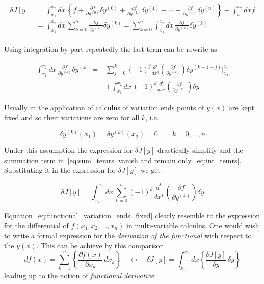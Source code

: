 \begin{align*}
  \delta J[y]
  &=\int_{x_1}^{x_2} dx \, \left\{ f +
    \frac{\partial f}{\partial y^{(0)}} \delta y^{(0)} +
    \frac{\partial f}{\partial y^{(1)}} \delta y^{(1)} + \cdots +
    \frac{\partial f}{\partial y^{(n)}} \delta y^{(n)}
    \right\} - \int_{x_1}^{x_2} dx f \\
  &=\int_{x_1}^{x_2} dx \,
    \sum_{k = 0}^{n} \frac{\partial f}{\partial y^{(k)}} \delta y^{(k)}
   =\sum_{k = 0}^{n}
    \int_{x_1}^{x_2} dx \, \frac{\partial f}{\partial y^{(k)}} \delta y^{(k)} \\
\end{align*}

Using integration by part repeatedly the last term can be rewrite as

\begin{align}
  \label{eq:sum_temrs}
  \int_{x_1}^{x_2} dx \, \frac{\partial f}{\partial y^{(k)}} \delta y^{(k)} =
  & \sum_{j=0}^{k} {(-1)}^j \frac{d^j}{dx^j}
  \left( \frac{\partial f}{\partial y^{(k)}} \right) \delta y^{(k-1-j)}
  \Big|_{x_1}^{x_2} \\
  \label{eq:int_temrs}
  & + \int_{x_1}^{x_2} dx \, {(-1)}^k \frac{d^k}{dx^k}
  \left( \frac{\partial f}{\partial y^{(k)}}\right) \delta y
\end{align}

Usually in the application of calculus of variation ends points of $y(x)$ are
kept fixed and so their variations are zero for all $k$, i.e.

\begin{equation} \label{eq:fixed_ends}
  \delta y^{(k)}(x_1) = \delta y^{(k)}(x_2) = 0  \qquad k = 0, \ldots, n
\end{equation}

Under this assumption the expression for $\delta J[y]$ drastically simplify and
the summation term in~\eqref{eq:sum_temrs} vanish and remain
only~\eqref{eq:int_temrs}. Substituting it in the expression for $\delta J[y]$
we get

\begin{equation} \label{eq:functional_variation_ends_fixed}
  \delta J[y] = \int_{x_1}^{x_2} dx \, \sum_{k = 0}^{n} {(-1)}^k \frac{d^k}{dx^k}
  \left( \frac{\partial f}{\partial y^{(k)}}\right) \delta y
\end{equation}

Equation~\eqref{eq:functional_variation_ends_fixed} clearly resemble to the
expression for the differential of $f(x_1, x_2, \ldots, x_n)$ in multi-variable
calculus. One would wish to write a formal expression for the \emph{derivation
of the functional} with respect to the $y(x)$. This can be achieve by this
comparison
\begin{equation*}
  df(x) = \sum_{k=1}^{n}
  \left\{ \frac{\partial f(x)}{\partial x_k} \, dx_k \right\}
  \quad \longleftrightarrow \quad
  \delta J[y] = \int_{x_1}^{x_2} dx
  \left\{ \frac{\delta J[y]}{\delta y} \, \delta y \right\}
\end{equation*}
leading up to the notion of \emph{functional derivative}

